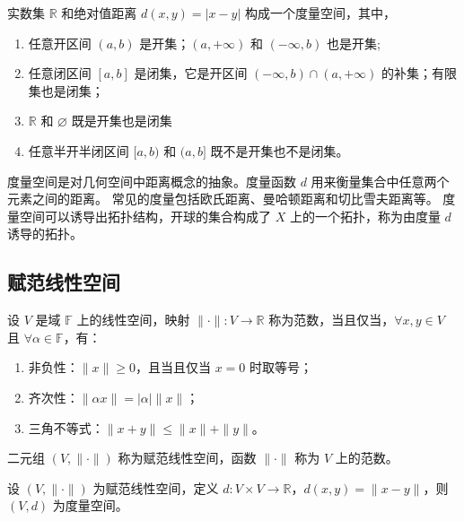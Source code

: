 \begin{example}
    实数集 $\mathbb{R}$ 和绝对值距离 $ d(x,y)=|x-y| $ 构成一个度量空间，其中，
    \begin{enumerate}
        \item 任意开区间 $ (a,b) $ 是开集；$(a,+\infty)$ 和 $(-\infty,b)$ 也是开集;
        \item 任意闭区间 $ [a,b] $ 是闭集，它是开区间 $(-\infty,b)\cap(a,+\infty)$ 的补集；有限集也是闭集；
        \item $\mathbb{R}$ 和 $\varnothing$ 既是开集也是闭集
        \item 任意半开半闭区间 $ [a,b) $ 和 $ (a,b] $ 既不是开集也不是闭集。
    \end{enumerate}
\end{example}

\vspace{1em}

\begin{note}
    度量空间是对几何空间中距离概念的抽象。度量函数 $ d $ 用来衡量集合中任意两个元素之间的距离。
    常见的度量包括欧氏距离、曼哈顿距离和切比雪夫距离等。
    度量空间可以诱导出拓扑结构，开球的集合构成了 $ X $ 上的一个拓扑，称为由度量 $ d $ 诱导的拓扑。
\end{note}

\vspace{1em}
\subsection{赋范线性空间}

\begin{definition}
    设 $ V $ 是域 $ \mathbb{F} $ 上的线性空间，映射 $ \|\cdot\|:V\to \mathbb{R} $ 称为范数，当且仅当，$ \forall x,y\in V $ 且 $ \forall \alpha\in \mathbb{F} $，有：
    \begin{enumerate}
        \item 非负性：$ \|x\|\geq 0 $，且当且仅当 $ x=0 $ 时取等号；
        \item 齐次性：$ \|\alpha x\|=|\alpha|\|x\| $；
        \item 三角不等式：$ \|x+y\|\leq \|x\|+\|y\| $。
    \end{enumerate}
    二元组 $ (V,\|\cdot\|) $ 称为赋范线性空间，函数 $ \|\cdot\| $ 称为 $ V $ 上的范数。
\end{definition}

\begin{proposition}[赋范线性空间诱导的度量]
    设 $ (V,\|\cdot\|) $ 为赋范线性空间，定义 $ d:V\times V\to \mathbb{R} $，$ d(x,y)=\|x-y\| $，则 $ (V,d) $ 为度量空间。
\end{proposition}

